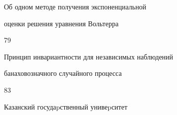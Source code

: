 {Об одном методе получения экспоненциальной


оценки решения уравнения Вольтерра}{79}




{Принцип инвариантности для независимых наблюдений\newline


банаховозначного случайного процесса}{83}








\vfill


\noindent\raisebox{2pt}{\copyright} Казанский госудаpственный унивеpситет





